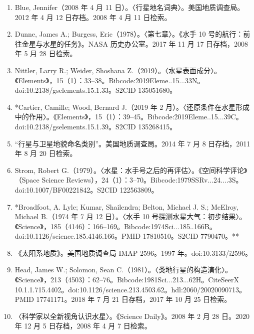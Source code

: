 \begin{enumerate}
    \item Blue, Jennifer（2008 年 4 月 11 日）。〈行星地名词典〉。美国地质调查局。2012 年 4 月 12 日存档。2008 年 4 月 11 日检索。
    \item Dunne, James A.; Burgess, Eric（1978）。〈第七章〉。《水手 10 号的航行：前往金星与水星的任务》。NASA 历史办公室。2017 年 11 月 17 日存档，2008 年 5 月 28 日检索。
    \item Nittler, Larry R.; Weider, Shoshana Z.（2019）。〈水星表面成分〉。《Elements》，15（1）：33–38。Bibcode:2019Eleme..15...33N。doi:10.2138/gselements.15.1.33。S2CID 135051680。
    \item *Cartier, Camille; Wood, Bernard J.（2019 年 2 月）。〈还原条件在水星形成中的作用〉。《Elements》，15（1）：39–45。Bibcode:2019Eleme..15...39C。doi:10.2138/gselements.15.1.39。S2CID 135268415。
    \item “行星与卫星地貌命名类别”。美国地质调查局。2014 年 7 月 8 日存档，2011 年 8 月 20 日检索。
    \item Strom, Robert G.（1979）。〈水星：水手号之后的再评估〉。《空间科学评论》（Space Science Reviews），24（1）：3–70。Bibcode:1979SSRv...24....3S。doi:10.1007/BF00221842。S2CID 122563809。
    \item *Broadfoot, A. Lyle; Kumar, Shailendra; Belton, Michael J. S.; McElroy, Michael B.（1974 年 7 月 12 日）。〈水手 10 号探测水星大气：初步结果〉。《Science》，185（4146）：166–169。Bibcode:1974Sci...185..166B。doi:10.1126/science.185.4146.166。PMID 17810510。S2CID 7790470。**
    \item 《太阳系地质》。美国地质调查局 IMAP 2596。1997 年。doi:10.3133/i2596。
    \item Head, James W.; Solomon, Sean C.（1981）。〈类地行星的构造演化〉。《Science》，213（4503）：62–76。Bibcode:1981Sci...213...62H。CiteSeerX 10.1.1.715.4402。doi:10.1126/science.213.4503.62。hdl:2060/20020090713。PMID 17741171。2018 年 7 月 21 日存档，2017 年 10 月 25 日检索。
    \item 〈科学家以全新视角认识水星〉。《Science Daily》。2008 年 2 月 28 日。2020 年 12 月 5 日存档，2008 年 4 月 7 日检索。

\end{enumerate}

